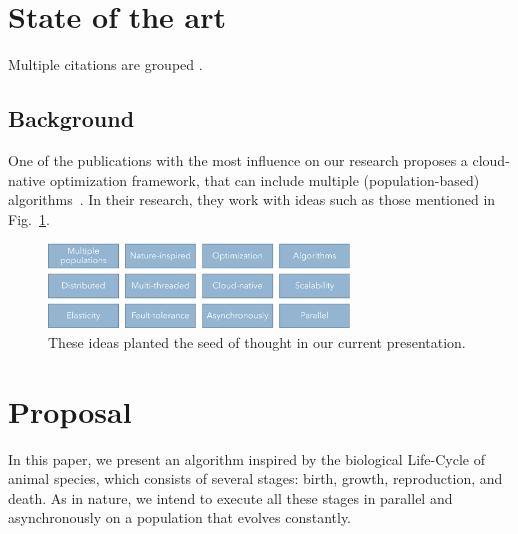\documentclass[runningheads]{llncs}
\begin{document}
\section{State of the art}

Multiple citations are grouped \cite{valdez2021container,krejca2020lower,witt2019upper,merelo2016nodio,merelo2016performance,fortin2012deap,stanley2002evolving}.


\subsection{Background}

One of the publications with the most influence on our research proposes a
cloud-native optimization framework, that can include multiple
(population-based) algorithms~\cite{valdez2021container}. In their research, they work with ideas such
as those mentioned in Fig.~\ref{fig1}.

\begin{figure}
    \centering
    \includegraphics[width=80mm]{img/fig1_background.pdf}
    \caption{These ideas planted the seed of thought in our current presentation.} \label{fig1}
    \end{figure}

\section{Proposal} 

In this paper, we present an algorithm inspired by the biological Life-Cycle of
animal species, which consists of several stages: birth, growth, reproduction,
and death. As in nature, we intend to execute all these stages in parallel and
asynchronously on a population that evolves constantly.
\end{document}
